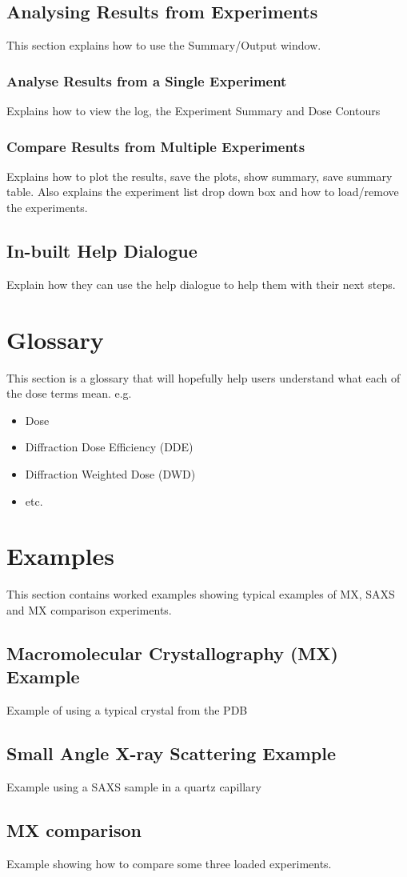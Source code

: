 \documentclass[a4paper]{article}
\begin{document}
\subsection{Analysing Results from Experiments}
This section explains how to use the Summary/Output window.

\subsubsection{Analyse Results from a Single Experiment}
Explains how to view the log, the Experiment Summary and Dose Contours

\subsubsection{Compare Results from Multiple Experiments}
Explains how to plot the results, save the plots, show summary, save summary table. Also explains the experiment list drop down box and how to load/remove the experiments.

\subsection{In-built Help Dialogue}
Explain how they can use the help dialogue to help them with their next steps.

\section{Glossary}
This section is a glossary that will hopefully help users understand what each of the dose terms mean. e.g.
\begin{itemize}
\item Dose
\item Diffraction Dose Efficiency (DDE)
\item Diffraction Weighted Dose (DWD)
\item etc.
\end{itemize}

\section{Examples}
This section contains worked examples showing typical examples of MX, SAXS and MX comparison experiments.

\subsection{Macromolecular Crystallography (MX) Example}
Example of using a typical crystal from the PDB

\subsection{Small Angle X-ray Scattering Example} 
Example using a SAXS sample in a quartz capillary

\subsection{MX comparison}
Example showing how to compare some three loaded experiments.
\end{document}

